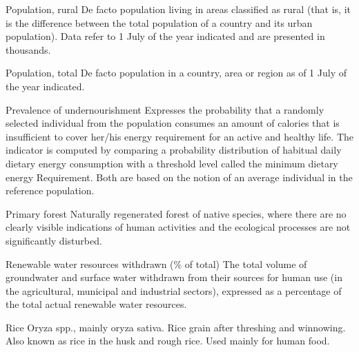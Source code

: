 \begin{MetadataCollection} {}
\begin{metadata}{Population, rural} {}
De facto population living in areas classified as rural (that is, it is the difference between the total population of a country and its urban population). Data refer to 1 July of the year indicated and are presented in thousands.
\end{metadata}

\begin{metadata}{Population, total} {}
De facto population in a country, area or region as of 1 July of the year indicated.
\end{metadata}

\begin{metadata}{Prevalence of undernourishment} {}
Expresses the probability that a randomly selected individual from the population consumes an amount of calories that is insufficient to cover her/his energy requirement for an active and healthy life. The indicator is computed by comparing a probability distribution of habitual daily dietary energy consumption with a threshold level called the minimum dietary energy Requirement. Both are based on the notion of an average individual in the reference population.
\end{metadata}

\begin{metadata}{Primary forest} {}
Naturally regenerated forest of native species, where there are no clearly visible indications of human activities and the ecological processes are not significantly disturbed.
\end{metadata}

\begin{metadata}{Renewable water resources withdrawn (\% of total)} {}
The total volume of groundwater and surface water withdrawn from their sources for human use (in the agricultural, municipal and industrial sectors), expressed as a percentage of the total actual renewable water resources.
\end{metadata}

\begin{metadata}{Rice} {}
Oryza spp., mainly oryza sativa.  Rice grain after threshing and winnowing. Also known as rice in the husk and rough rice. Used mainly for human food.
\end{metadata}


\end{MetadataCollection}
